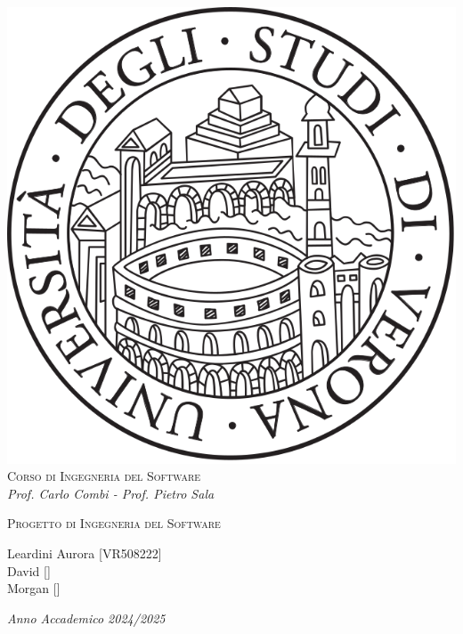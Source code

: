 \begin{titlepage}
\begin{center}
\begin{spacing}{1.5}
\includegraphics[width=.2\textwidth, height=.2\textheight, keepaspectratio]{figures/verona.png}\\
{{\Large{\textsc{Corso di Ingegneria del Software}}}}\\
{\large{\it Prof. Carlo Combi - Prof. Pietro Sala}}
\end{spacing}
\end{center}
\vspace{15mm}
\begin{center}
\begin{spacing}{1.5}
    
{\large }

{\LARGE{\textsc{Progetto di Ingegneria del Software}}}\\
\begin{center}
{\large{\textsc Leardini Aurora [VR508222] \\David [] \\Morgan []}}
\end{center}
\end{spacing}
\end{center}
\vspace{35mm}
\par
\noindent
\vspace{45mm}
\begin{center}
{\large{\it Anno Accademico 2024/2025 }}
\end{center}
\end{titlepage}